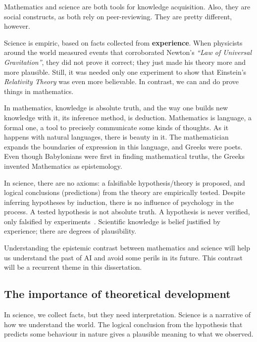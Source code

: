 Mathematics and science are both tools for knowledge acquisition. Also, they are social constructs, as both rely on peer-reviewing. They are pretty different, however.

Science is empiric, based on facts collected from \textbf{experience}. When physicists around the world measured events that corroborated Newton's \emph{``Law of Universal Gravitation''}, they did not prove it correct; they just made his theory more and more plausible. Still, it was needed only one experiment to show that Einstein's \emph{Relativity Theory} was even more believable. In contrast, we can and do prove things in mathematics.

In mathematics, knowledge is absolute truth, and the way one builds new knowledge with it, its inference method, is deduction.  Mathematics is language, a formal one, a tool to precisely communicate some kinds of thoughts. As it happens with natural languages, there is beauty in it. The mathematician expands the boundaries of expression in this language, and Greeks were poets. Even though Babylonians were first in finding mathematical truths, the Greeks invented Mathematics as epistemology.

In science, there are no axioms: a falsifiable hypothesis/theory is proposed, and logical conclusions (predictions) from the theory are empirically tested. Despite inferring hypotheses by induction, there is no influence of psychology in the process. A tested hypothesis is not absolute truth. A hypothesis is never verified, only falsified by experiments~\cite[p. 31-50]{popper:2004}. Scientific knowledge is belief justified by experience; there are degrees of plausibility.

Understanding the epistemic contrast between mathematics and science will help us understand the past of \acf{AI} and avoid some perils in its future. This contrast will be a recurrent theme in this dissertation.

\subsection{The importance of theoretical development} In science, we collect facts, but they need interpretation. Science is a narrative of how we understand the world\cite{gleiser:2018}. The logical conclusion from the hypothesis that predicts some behaviour in nature gives a plausible meaning to what we observed.

